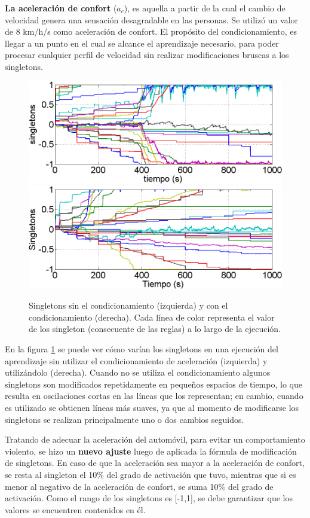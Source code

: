 \textbf{La aceleración de confort} ($a_c$), es aquella a partir de la cual el cambio de velocidad genera una sensación desagradable en las personas. Se utilizó un valor de 8 km/h/s como aceleración de confort. El propósito del condicionamiento, es llegar a un punto en el cual se alcance el aprendizaje necesario, para poder procesar cualquier perfil de velocidad sin realizar modificaciones bruscas a los singletons.

\begin{figure}[htb]
\centering
\includegraphics[width=0.5\linewidth,type=png,ext=.png,read=.png]{figures/421single1}\includegraphics[width=0.5\linewidth,type=png,ext=.png,read=.png]{figures/421single2}
\caption{Singletons sin el condicionamiento (izquierda) y con el condicionamiento (derecha). Cada línea de color representa el valor de los singleton (consecuente de las reglas) a lo largo de la ejecución.}
\label{fig:421single2}
\end{figure} 

En la figura \ref{fig:421single2} se puede ver cómo varían los singletons en una ejecución del aprendizaje sin utilizar el condicionamiento de aceleración (izquierda) y utilizándolo (derecha). Cuando no se utiliza el condicionamiento algunos singletons son modificados repetidamente en pequeños espacios de tiempo, lo que resulta en oscilaciones cortas en las líneas que los representan; en cambio, cuando es utilizado se obtienen líneas más suaves, ya que al momento de modificarse los singletons se realizan principalmente uno o dos cambios seguidos.

Tratando de adecuar la aceleración del automóvil, para evitar un comportamiento violento, se hizo un \textbf{nuevo ajuste} luego de aplicada la fórmula de modificación de singletons. En caso de que la aceleración sea mayor a la aceleración de confort, se resta al singleton el 10\% del grado de activación que tuvo, mientras que si es menor al negativo de la aceleración de confort, se suma 10\% del grado de activación. Como el rango de los singletons es [-1,1], se debe garantizar que los valores se encuentren contenidos en él. 

